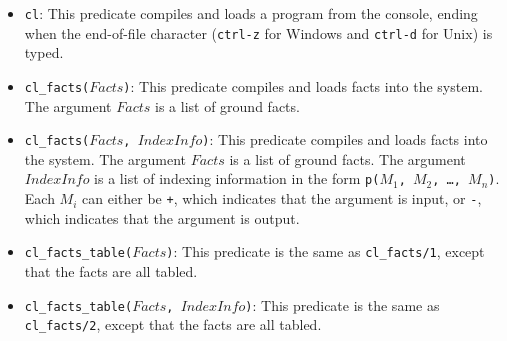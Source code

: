 \begin{itemize}
\item \texttt{cl}: This predicate compiles and loads a program from the console, ending when the end-of-file character ({\tt ctrl-z} for Windows and {\tt ctrl-d} for Unix) is typed.


\item \texttt{cl\_facts($Facts$)}: This predicate compiles and loads facts into the system.  The argument $Facts$ is a list of ground facts.

\item \texttt{cl\_facts($Facts$, $IndexInfo$)}: This predicate compiles and loads facts into the system.  The argument $Facts$ is a list of ground facts.  The argument $IndexInfo$ is a list of indexing information in the form \texttt{p($M_1$, $M_2$, \ldots, $M_n$)}.  Each $M_i$ can either be \texttt{+}, which indicates that the argument is input, or \texttt{-}, which indicates that the argument is output.

\item \texttt{cl\_facts\_table($Facts$)}: This predicate is the same as \texttt{cl\_facts/1}, except that the facts are all tabled.

\item \texttt{cl\_facts\_table($Facts$, $IndexInfo$)}: This predicate is the same as \texttt{cl\_facts/2}, except that the facts are all tabled.
\end{itemize}

